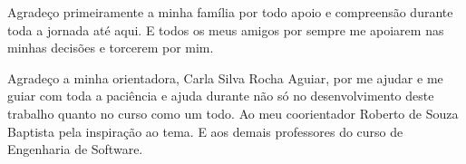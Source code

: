 \begin{agradecimentos}
  Agradeço primeiramente a minha família por todo apoio e compreensão durante toda a jornada até aqui. E todos
os meus amigos por sempre me  apoiarem nas minhas decisões e torcerem por mim.

  Agradeço a minha orientadora, Carla Silva Rocha Aguiar, por me ajudar e me guiar
 com toda a paciência e ajuda durante não só no desenvolvimento deste trabalho quanto no
curso como um todo. Ao meu coorientador Roberto de Souza Baptista pela inspiração ao tema. E aos demais professores do
curso de Engenharia de Software.

\end{agradecimentos}
